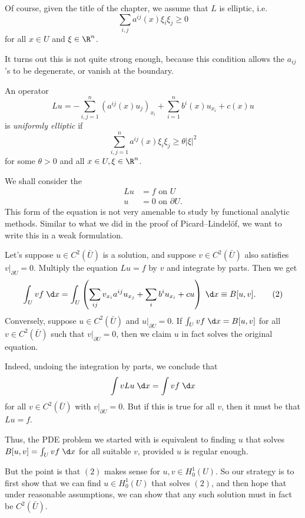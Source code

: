 \documentclass[a4paper]{article}
\begin{document}
Of course, given the title of the chapter, we assume that $L$ is elliptic, i.e.
\[
  \sum_{i, j} a^{ij}(x) \xi_i \xi_j \geq 0
\]
for all $x \in U$ and $\xi \in \R^n$.

It turns out this is not quite strong enough, because this condition allows the $a_{ij}$'s to be degenerate, or vanish at the boundary.

\begin{defi}
  An operator
  \[
    Lu = - \sum_{i, j = 1}^n (a^{ij}(x) u_j)_{x_i} + \sum_{i = 1}^n b^i(x) u_{x_i} + c(x) u
  \]
  is \emph{uniformly elliptic} if
  \[
    \sum_{i, j = 1}^n a^{ij}(x) \xi_i \xi_j \geq \theta |\xi|^2
  \]
  for some $\theta > 0$ and all $x \in U, \xi \in\R^n$.
\end{defi}

We shall consider the 
\begin{align*}
  Lu &= f \text{ on }U\\
  u &= 0 \text{ on }\partial U.
\end{align*}
This form of the equation is not very amenable to study by functional analytic methods. Similar to what we did in the proof of Picard--Lindel\"of, we want to write this in a weak formulation.

Let's suppose $u \in C^2(\bar{U})$ is a solution, and suppose $v \in C^2(\bar{U})$ also satisfies $v|_{\partial U} = 0$. Multiply the equation $Lu = f$ by $v$ and integrate by parts. Then we get
\[
  \int_U vf \;\d x = \int_U \left(\sum_{ij} v_{x_i} a^{ij} u_{x_j} + \sum_i b^i u_{x_i} + c u\right)\;\d x \equiv B[u, v].\tag{$2$}
\]
Conversely, suppose $u \in C^2(\bar{U})$ and $u|_{\partial U} = 0$. If $\int_U vf\;\d x = B[u, v]$ for all $v \in C^2(\bar{U})$ such that $v|_{\partial U} = 0$, then we claim $u$ in fact solves the original equation.

Indeed, undoing the integration by parts, we conclude that
\[
  \int v Lu \;\d x = \int v f\;\d x
\]
for all $v \in C^2(\bar{U})$ with $v|_{\partial U} = 0$. But if this is true for all $v$, then it must be that $Lu = f$.

Thus, the PDE problem we started with is equivalent to finding $u$ that solves $B[u, v] = \int_U v f\;\d x$ for all suitable $v$, provided $u$ is regular enough.

But the point is that $(2)$ makes sense for $u, v \in H_0^1(U)$. So our strategy is to first show that we can find $u \in H_0^1(U)$ that solves $(2)$, and then hope that under reasonable assumptions, we can show that any such solution must in fact be $C^2(\bar{U})$.
\end{document}
